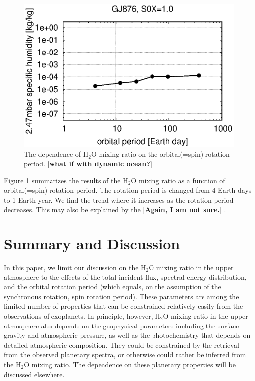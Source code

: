 \documentclass[11pt,numberedappendix,twocolappendix,]{emulateapj}
\def\water{H$_2$O }
\def\memo#1{\color{red}$[${\bf #1}$]$ \color{black}}
\begin{document}
\begin{figure}[!h]
    \begin{center}
    \includegraphics[width=\hsize]{fig/AqOH0TLS_GJ876_q_sensitivity_changeP.eps}
    \end{center}
\caption{The dependence of \water mixing ratio on the orbital(=spin) rotation period. \memo{what if with dynamic ocean?}}                                                                                                             
\label{fig:changeP}
\end{figure}

Figure \ref{fig:changeP} summarizes the results of the \water mixing ratio as a function of orbital(=spin) rotation period. 
The rotation period is changed from 4 Earth days to 1 Earth year. 
We find the trend where it increases as the rotation period decreases. 
This may also be explained by the \memo{Again, I am not sure.}.

\section{Summary and Discussion}
\label{s:summary}

In this paper, we limit our discussion on the \water mixing ratio in the upper atmosphere to the effects of the total incident flux, spectral energy distribution, and the orbital rotation period (which equals, on the assumption of the synchronous rotation, spin rotation period). 
These parameters are among the limited number of properties that can be constrained relatively easily from the observations of exoplanets. 
In principle, however, \water mixing ratio in the upper atmosphere also depends on the geophysical parameters including the surface gravity and atmospheric pressure, as well as the photochemistry that depends on detailed atmospheric composition. 
They could be constrained by the retrieval from the observed planetary spectra, or otherwise could rather be inferred from the \water mixing ratio. 
The dependence on these planetary properties will be discussed elsewhere. 
\end{document}
